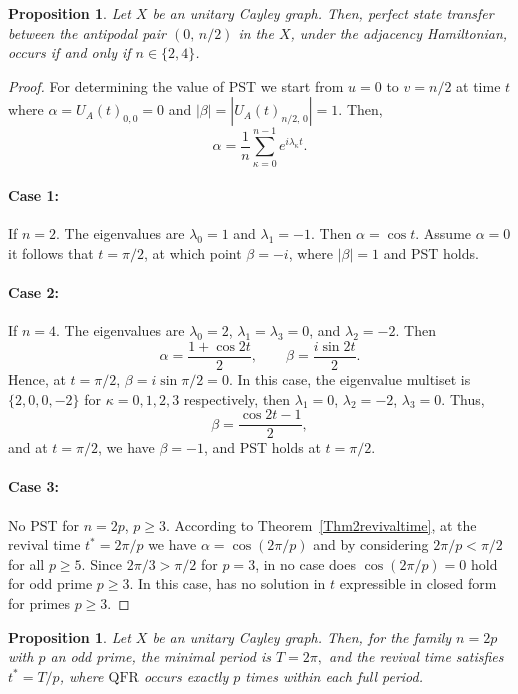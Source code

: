 \documentclass[12pt]{amsart}
\newcommand{\case}[1]{\paragraph*{Case #1:}}
\newtheorem{proposition}[theorem]{Proposition}
\newcommand{\QFR}{\mathrm{QFR}}
\begin{document}
\begin{proposition}\label{prop001pst}
Let $X$ be an unitary Cayley graph. Then, perfect state transfer between the antipodal pair $(0,\, n/2)$ in the 
  $X$, under the adjacency Hamiltonian, occurs if and only if
  $n \in \{2, 4\}$. 
\end{proposition}
\begin{proof}
For determining the value of  PST we start from $u=0$ to $v=n/2$ at time $t$ where $\alpha = U_A(t)_{0,0} = 0$ and
  $|\beta| = |U_A(t)_{n/2,\, 0}| = 1$. Then,
  \[
    \alpha = \frac{1}{n}\sum_{\kappa=0}^{n-1} e^{i\lambda_{\kappa} t}.
  \]
\case{1} If $n=2$. The eigenvalues are $\lambda_0 = 1$ and $\lambda_1 = -1$.
  Then $\alpha=\cos t$. Assume $\alpha = 0$ it follows that
  $t = \pi/2$, at which point
  $\beta=-i$, where $|\beta| = 1$ and PST holds.
  
\case{2} If $n=4$.  The eigenvalues are $\lambda_0 = 2$, $\lambda_1 = \lambda_3 = 0$,
  and $\lambda_2 = -2$. Then
  \[
    \alpha=\frac{1+ \cos 2t}{2}, \qquad \beta=\frac{i\sin 2t}{2}.
  \]
Hence, at $t=\pi/2$, $\beta = i\sin\pi/2 = 0$. In this case, the eigenvalue multiset is $\{2, 0, 0, -2\}$ for $\kappa= 0,1,2,3$ respectively, then
  $\lambda_1 = 0$, $\lambda_2 = -2$, $\lambda_3 = 0$. Thus, 
  \[
  \beta=\frac{\cos 2t - 1}{2},
  \]
and at $t = \pi/2$, we have $\beta=-1$, and PST holds at $t = \pi/2$.

\case{3} No PST for $n = 2p$, $p \geq 3$. According to Theorem~\ref{Thm2revivaltime}, 
  at the revival time $t^* = 2\pi/p$ we have $\alpha = \cos(2\pi/p)$ and by considering $2\pi/p < \pi/2$
  for all $p \geq 5$. Since $2\pi/3 > \pi/2$ for $p = 3$, in no case does $\cos(2\pi/p) = 0$
  hold for odd prime $p \geq 3$. In this case, has no solution in $t$ expressible in closed
  form for primes $p \geq 3$.
\end{proof}

\begin{proposition}\label{prop002pst}
Let $X$ be an unitary Cayley graph. Then, for the family $n=2p$ with $p$ an odd prime, the minimal
  period is $  T = 2\pi,$
  and the revival time satisfies $t^* = T/p$, where $\QFR$ occurs exactly $p$ times within  each full period.
\end{proposition}
\end{document}
